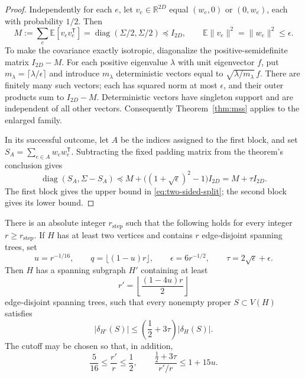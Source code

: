 \begin{proof}
Independently for each $e$, let $v_e\in\mathbb R^{2D}$ equal
$(w_e,0)$ or $(0,w_e)$, each with probability $1/2$.  Then
\[
 M:=\sum_e\mathbb E[v_ev_e^{\mathsf T}]
   =\operatorname{diag}(\Sigma/2,\Sigma/2)\preceq I_{2D},
 \qquad \mathbb E\|v_e\|^2=\|w_e\|^2\leq\epsilon.
\]
To make the covariance exactly isotropic, diagonalize the
positive-semidefinite matrix $I_{2D}-M$.  For each positive eigenvalue
$\lambda$ with unit eigenvector $f$, put
$m_\lambda=\lceil\lambda/\epsilon\rceil$ and introduce
$m_\lambda$ deterministic vectors equal to
$\sqrt{\lambda/m_\lambda}\,f$.
There are finitely many such vectors; each has squared norm at most
$\epsilon$, and their outer products sum to $I_{2D}-M$.
Deterministic vectors have singleton support and are independent of
all other vectors.  Consequently Theorem~\ref{thm:mss} applies to the
enlarged family.

In its successful outcome, let $A$ be the indices assigned to the first
block, and set $S_A=\sum_{e\in A}w_ew_e^{\mathsf T}$.
Subtracting the fixed padding matrix from the theorem's conclusion
gives
\[
 \operatorname{diag}(S_A,\Sigma-S_A)
 \preceq M+\bigl((1+\sqrt\epsilon)^2-1\bigr)I_{2D}
 =M+\tau I_{2D}.
\]
The first block gives the upper bound in
\eqref{eq:two-sided-split}; the second block gives its lower bound.
\end{proof}

\begin{proposition}
\label{prop:step}
There is an absolute integer $r_{\mathrm{step}}$ such that the following
holds for every integer $r\geq r_{\mathrm{step}}$.  If $H$ has at
least two vertices and contains $r$ edge-disjoint spanning trees, set
\[
 u=r^{-1/16},\qquad q=\lfloor(1-u)r\rfloor,
 \qquad \epsilon=6r^{-1/2},\qquad
 \tau=2\sqrt\epsilon+\epsilon.
\]
Then $H$ has a spanning subgraph $H'$ containing at least
\begin{equation}
 r'=\left\lfloor\frac{(1-4u)r}{2}\right\rfloor
 \label{eq:step-packing-count}
\end{equation}
edge-disjoint spanning trees, such that every nonempty proper
$S\subset V(H)$ satisfies
\begin{equation}
 |\delta_{H'}(S)|\leq
 \left(\frac12+3\tau\right)|\delta_H(S)|.
 \label{eq:step-cut-bound}
\end{equation}
The cutoff may be chosen so that, in addition,
\begin{equation}
 \frac5{16}\leq\frac{r'}r\leq\frac12,
 \qquad
 \frac{\frac12+3\tau}{r'/r}\leq1+15u.
 \label{eq:step-ratio-bound}
\end{equation}
\end{proposition}

